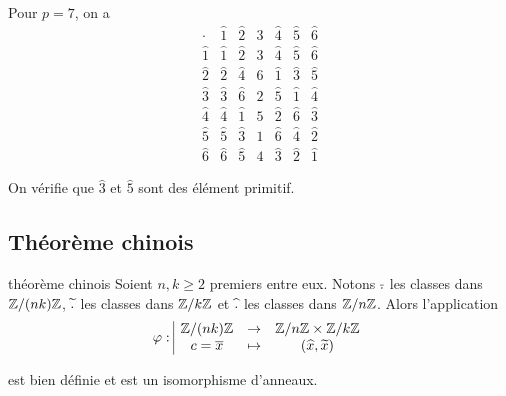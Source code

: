 \begin{exemple}
    Pour $p = 7$, on a 
    \[
        \begin{array}{c|cccccc}
            \cdot & \widehat{1} & \widehat{2} & \widehat{3} & \widehat{4} & \widehat{5} & \widehat{6} \\
            \hline
            \widehat{1} & \widehat{1} & \widehat{2} & \widehat{3} & \widehat{4} & \widehat{5} & \widehat{6} \\
            \widehat{2} & \widehat{2} & \widehat{4} & \widehat{6} & \widehat{1} & \widehat{3} & \widehat{5} \\
            \widehat{3} & \widehat{3} & \widehat{6} & \widehat{2} & \widehat{5} & \widehat{1} & \widehat{4} \\
            \widehat{4} & \widehat{4} & \widehat{1} & \widehat{5} & \widehat{2} & \widehat{6} & \widehat{3} \\
            \widehat{5} & \widehat{5} & \widehat{3} & \widehat{1} & \widehat{6} & \widehat{4} & \widehat{2} \\
            \widehat{6} & \widehat{6} & \widehat{5} & \widehat{4} & \widehat{3} & \widehat{2} & \widehat{1} 
        \end{array}
    \]

    On vérifie que $\widehat 3$ et $\widehat 5$ sont des élément primitif.
\end{exemple}


\subsection{Théorème chinois }

\begin{theoreme}{théorème chinois}{}
    Soient $n, k \geqslant 2$ premiers entre eux. Notons $\overline{.} \space $ les 
    classes dans $\mathbb{Z} / (n k) \mathbb{Z}$, $\widetilde{.}\space $ les classes dans $\mathbb{Z} / k \mathbb{Z}$ et 
    $\space \widehat{.} \space $ les classes dans $\mathbb{Z} / n \mathbb{Z}$.
    Alors l'application 
    $$\varphi: \space \begin{array}{|ccc} \displaystyle \mathbb{Z} / (n k) \mathbb{Z} & \to & \displaystyle \mathbb{Z} / n \mathbb{Z} \times \mathbb{Z} / k \mathbb{Z} \\ \displaystyle c = \overline x & \mapsto & \displaystyle (\widehat x, \widetilde x) \end{array}$$

    est bien définie et est un isomorphisme d'anneaux.
\end{theoreme}

